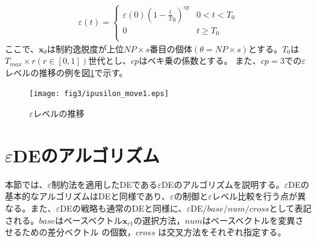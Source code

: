 \documentclass[a4paper,12pt]{jsreport}
\begin{document}
\begin{eqnarray}
\varepsilon(t)=
\left\{
\begin{array}{cc}
    {\varepsilon}(0){(1-\frac{t}{T}_0)}^{cp} & \mbox{$0<t<{T}_0$} \\
    {0} & \mbox{$t\geq{T}_0$}\\
\end{array}
\right.
\label{fig:εレベル制御の式}
\end{eqnarray}
ここで、${\bm x}_\theta$は制約逸脱度が上位$NP\times s$番目の個体$(\theta=NP\times s)$とする。${T}_0$は${T}_{max} × r(r\in [0,1])$世代とし、$cp$はベキ乗の係数とする。
また、$cp=3$での$\varepsilon$レベルの推移の例を図\ref{fig:εレベルの動き1}で示す。

\begin{figure}[htbp]
  \centering
  \texttt{[image: fig3/ipusilon\_move1.eps]}
  \caption{$\varepsilon$レベルの推移}
  \label{fig:εレベルの動き1}
\end{figure}

\section{$\varepsilon$DEのアルゴリズム}
本節では、$\varepsilon$制約法を適用したDEである$\varepsilon$DEのアルゴリズムを説明する。$\varepsilon$DEの基本的なアルゴリズムはDEと同様であり、$\varepsilon$の制御と$\varepsilon$レベル比較を行う点が異なる。また、$\varepsilon$DEの戦略も通常のDEと同様に、$\varepsilon$DE$/base/num/cross$として表記される。$base$はベースベクトル$\bm{x}_{r1}$の選択方法，$num$はベースベクトルを変異させるための差分ベクトル
の個数，$cross$ は交叉方法をそれぞれ指定する。
\end{document}
